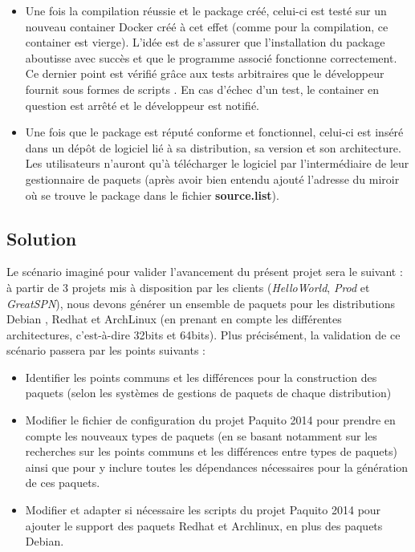 \documentclass[12pt,a4paper]{article}
\begin{document}
\begin{itemize}
\item Une fois la compilation réussie et le package créé, celui-ci est testé sur un nouveau container Docker créé à cet effet (comme pour la compilation, ce container est vierge). L'idée est de s'assurer que l'installation du package aboutisse avec succès et que le programme associé fonctionne correctement. Ce dernier point est vérifié grâce aux tests arbitraires que le développeur fournit sous formes de scripts . En cas d'échec d'un test, le container en question est arrêté et le développeur est notifié.
\item Une fois que le package est réputé conforme et fonctionnel, celui-ci est inséré dans un dépôt de logiciel lié à sa distribution, sa version et son architecture. Les utilisateurs n'auront qu'à télécharger le logiciel par l'intermédiaire de leur gestionnaire de paquets (après avoir bien entendu ajouté l'adresse du miroir où se trouve le package dans le fichier \textbf{source.list}).
\end{itemize}

\subsection{Solution}

Le scénario imaginé pour valider l'avancement du présent projet sera le suivant : à partir de 3 projets mis à disposition par les clients (\textit{HelloWorld}, \textit{Prod} et \textit{GreatSPN}), nous devons générer un ensemble de paquets pour les distributions Debian , Redhat et ArchLinux (en prenant en compte les différentes architectures, c'est-à-dire 32bits et 64bits). Plus précisément, la validation de ce scénario passera par les points suivants :
\begin{itemize}\renewcommand{\labelitemi}{$\bullet$}
\item Identifier les points communs et les différences pour la construction des paquets (selon les systèmes de gestions de paquets de chaque distribution)
\item Modifier le fichier de configuration du projet Paquito 2014 pour prendre en compte les nouveaux types de paquets (en se basant notamment sur les recherches sur les points communs et les différences entre types de paquets) ainsi que pour y inclure toutes les dépendances nécessaires pour la génération de ces paquets.
\item Modifier et adapter si nécessaire les scripts du projet Paquito 2014 pour ajouter le support des paquets Redhat et Archlinux, en plus des paquets Debian.
\end{itemize}
\end{document}
